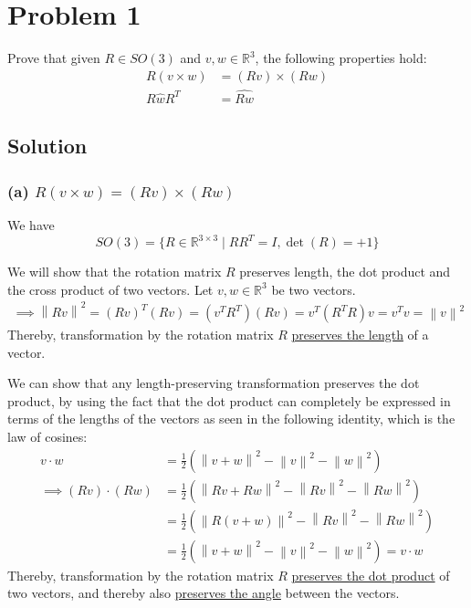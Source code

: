 \section*{Problem 1}

Prove that given \(R \in S O(3)\) and \(v, w \in \mathbb{R}^{3}\), the following properties hold:
\begin{align*}
    R(v \times w)   & =(R v) \times(R w) \\
    R \hat{w} R^{T} & =\widehat{R w}
\end{align*}

\subsection*{Solution}

\subsubsection*{(a) \( R(v \times w) =(R v) \times(R w) \)}

We have
\[
    SO(3) = \{ R \in \mathbb{R}^{3 \times 3} \mid R R^{T} = I, \det(R) = +1 \}
\]

We will show that the rotation matrix \( R \) preserves length, the dot product and the cross product of two vectors.
Let \( v, w \in \mathbb{R}^{3} \) be two vectors.
\begin{align*}
    \implies
    \left \| R v \right \| ^{2}
        = {(R v)}^{T} (R v)
    = (v^{T} R^{T}) (R v)
    = v^{T} (R^{T} R) v
    = v^{T} v
    = \left \| v \right \| ^{2}
\end{align*}
Thereby, transformation by the rotation matrix \( R \) \underline{preserves the length} of a vector.

We can show that any length-preserving transformation preserves the dot product, by using the fact that the dot product can completely be expressed in terms of the lengths of the vectors as seen in the following identity, which is the law of cosines:
\begin{align*}
    v \cdot w
     & = \frac{1}{2} \left( \left \| v + w \right \| ^{2} - \left \| v \right \| ^{2} - \left \| w \right \| ^{2} \right)
    \\ \implies
    (R v) \cdot (R w)
     & = \frac{1}{2} \left( \left \| R v + R w \right \| ^{2} - \left \| R v \right \| ^{2} - \left \| R w \right \| ^{2} \right)
    \\ & = \frac{1}{2} \left( \left \| R (v + w) \right \| ^{2} - \left \| R v \right \| ^{2} - \left \| R w \right \| ^{2} \right)
    \\ & = \frac{1}{2} \left( \left \| v + w \right \| ^{2} - \left \| v \right \| ^{2} - \left \| w \right \| ^{2} \right)
    = v \cdot w
\end{align*}
Thereby, transformation by the rotation matrix \( R \) \underline{preserves the dot product} of two vectors, and thereby also \underline{preserves the angle} between the vectors.


